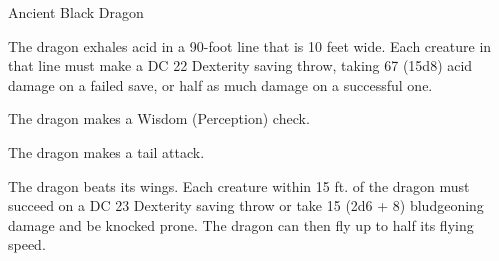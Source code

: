 \begin{monsterbox}{Ancient Black Dragon}
\begin{monsteraction}
\end{monsteraction}
\begin{monsteraction}
The dragon exhales acid in a 90-foot line that is 10 feet wide. Each creature in that line must make a DC 22 Dexterity saving throw, taking 67 (15d8) acid damage on a failed save, or half as much damage on a successful one.
\end{monsteraction}
\begin{monsteraction}[Detect]
The dragon makes a Wisdom (Perception) check.
\end{monsteraction}
\begin{monsteraction}
The dragon makes a tail attack.
\end{monsteraction}
\begin{monsteraction}
The dragon beats its wings. Each creature within 15 ft. of the dragon must succeed on a DC 23 Dexterity saving throw or take 15 (2d6 + 8) bludgeoning damage and be knocked prone. The dragon can then fly up to half its flying speed.
\end{monsteraction}
\end{monsterbox}